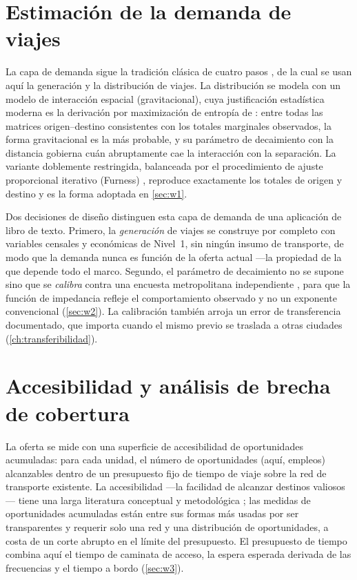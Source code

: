 \section{Estimación de la demanda de viajes}
\label{sec:marco-demanda}

La capa de demanda sigue la tradición clásica de cuatro pasos
\parencite{mcnally2000fourstep, ortuzar2011}, de la cual se usan aquí la generación y la
distribución de viajes. La distribución se modela con un modelo de interacción espacial
(gravitacional), cuya justificación estadística moderna es la derivación por maximización
de entropía de \textcite{wilson1971gravity}: entre todas las matrices origen--destino
consistentes con los totales marginales observados, la forma gravitacional es la más
probable, y su parámetro de decaimiento con la distancia gobierna cuán abruptamente cae la
interacción con la separación. La variante doblemente restringida, balanceada por el
procedimiento de ajuste proporcional iterativo (Furness) \parencite{furness1965}, reproduce
exactamente los totales de origen y destino y es la forma adoptada en \cref{sec:w1}.

Dos decisiones de diseño distinguen esta capa de demanda de una aplicación de libro de
texto. Primero, la \emph{generación} de viajes se construye por completo con variables
censales y económicas de Nivel~1, sin ningún insumo de transporte, de modo que la demanda
nunca es función de la oferta actual ---la propiedad de la que depende todo el marco.
Segundo, el parámetro de decaimiento no se supone sino que se \emph{calibra} contra una
encuesta metropolitana independiente \parencite{imeplan_eod2022}, para que la función de
impedancia refleje el comportamiento observado y no un exponente convencional
(\cref{sec:w2}). La calibración también arroja un error de transferencia documentado, que
importa cuando el mismo previo se traslada a otras ciudades (\cref{ch:transferibilidad}).

\section{Accesibilidad y análisis de brecha de cobertura}
\label{sec:marco-accesibilidad}

La oferta se mide con una superficie de accesibilidad de oportunidades acumuladas: para
cada unidad, el número de oportunidades (aquí, empleos) alcanzables dentro de un
presupuesto fijo de tiempo de viaje sobre la red de transporte existente. La accesibilidad
---la facilidad de alcanzar destinos valiosos--- tiene una larga literatura conceptual y
metodológica \parencite{handy1997, geurs2004}; las medidas de oportunidades acumuladas
están entre sus formas más usadas por ser transparentes y requerir solo una red y una
distribución de oportunidades, a costa de un corte abrupto en el límite del presupuesto. El
presupuesto de tiempo combina aquí el tiempo de caminata de acceso, la espera esperada
derivada de las frecuencias y el tiempo a bordo (\cref{sec:w3}).

